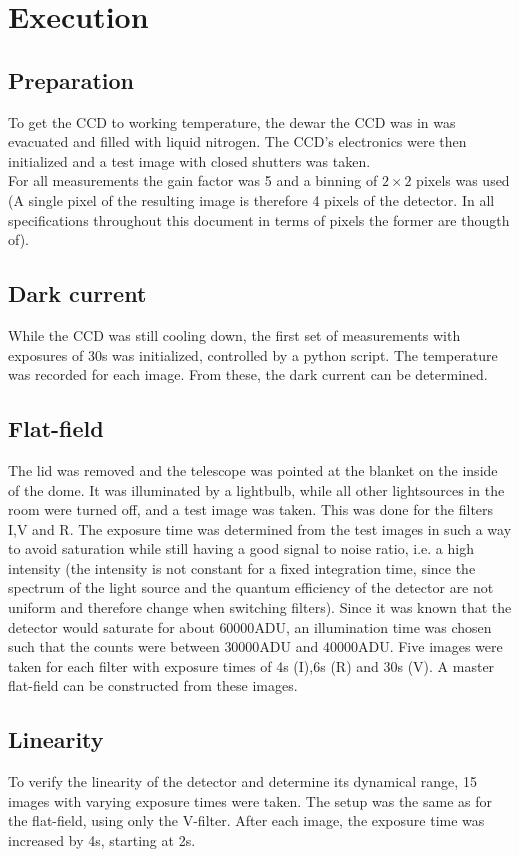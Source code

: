 \documentclass[12pt]{article}
\begin{document}
\section{Execution}
\subsection{Preparation}
	To get the CCD to working temperature, the dewar the CCD was in was evacuated and filled with liquid nitrogen. The CCD's electronics were then initialized and a test image with closed shutters was taken.\\
	For all measurements the gain factor was 5 and a binning of $2\times2$ pixels was used (A single pixel of the resulting image is therefore 4 pixels of the detector. In all specifications throughout this document in terms of pixels the former are thougth of).
\subsection{Dark current}
	While the CCD was still cooling down, the first set of measurements with exposures of 30s was initialized, controlled by a python script. The temperature was recorded for each image. From these, the dark current can be determined.
\subsection{Flat-field}
	The lid was removed and the telescope was pointed at the blanket on the inside of the dome. It was illuminated by a lightbulb, while all other lightsources in the room were turned off, and a test image was taken. This was done for the filters I,V and R. The exposure time was determined from the test images in such a way to avoid saturation while still having a good signal to noise ratio, i.e. a high intensity (the intensity is not constant for a fixed integration time, since the spectrum of the light source and the quantum efficiency of the detector are not uniform and therefore change when switching filters). Since it was known that the detector would saturate for about $60000$ADU, an illumination time was chosen such that the counts were between $30000$ADU and $40000$ADU. Five images were taken for each filter with exposure times of 4s (I),6s (R) and 30s (V). A master flat-field can be constructed from these images.
\subsection{Linearity}
	To verify the linearity of the detector and determine its dynamical range, 15 images with varying exposure times were taken. The setup was the same as for the flat-field, using only the V-filter. After each image, the exposure time was increased by 4s, starting at 2s.
\end{document}

